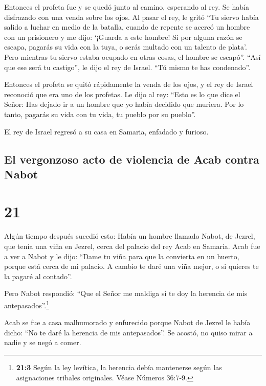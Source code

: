  Entonces el profeta fue y se quedó junto al camino,
esperando al rey. Se había disfrazado con una venda sobre los ojos.
 Al pasar el rey, le gritó ``Tu siervo había salido a
luchar en medio de la batalla, cuando de repente se acercó un hombre con
un prisionero y me dijo: `¡Guarda a este hombre! Si por alguna razón se
escapa, pagarás su vida con la tuya, o serás multado con un talento de
plata'.  Pero mientras tu siervo estaba ocupado en otras
cosas, el hombre se escapó''. ``Así que ese será tu castigo'', le dijo
el rey de Israel. ``Tú mismo te has condenado''.

 Entonces el profeta se quitó rápidamente la venda de los
ojos, y el rey de Israel reconoció que era uno de los profetas.
 Le dijo al rey: ``Esto es lo que dice el Señor: Has
dejado ir a un hombre que yo había decidido que muriera. Por lo tanto,
pagarás su vida con tu vida, tu pueblo por su pueblo''.

 El rey de Israel regresó a su casa en Samaria, enfadado
y furioso.

\hypertarget{el-vergonzoso-acto-de-violencia-de-acab-contra-nabot}{%
\subsection{El vergonzoso acto de violencia de Acab contra
Nabot}\label{el-vergonzoso-acto-de-violencia-de-acab-contra-nabot}}

\hypertarget{section-20}{%
\section{21}\label{section-20}}

 Algún tiempo después sucedió esto: Había un hombre
llamado Nabot, de Jezrel, que tenía una viña en Jezrel, cerca del
palacio del rey Acab en Samaria.  Acab fue a ver a Nabot y
le dijo: ``Dame tu viña para que la convierta en un huerto, porque está
cerca de mi palacio. A cambio te daré una viña mejor, o si quieres te la
pagaré al contado''.

 Pero Nabot respondió: ``Que el Señor me maldiga si te doy
la herencia de mis antepasados''.\footnote{\textbf{21:3} Según la ley
  levítica, la herencia debía mantenerse según las asignaciones tribales
  originales. Véase Números 36:7-9.}

 Acab se fue a casa malhumorado y enfurecido porque Nabot
de Jezrel le había dicho: ``No te daré la herencia de mis antepasados''.
Se acostó, no quiso mirar a nadie y se negó a comer.

